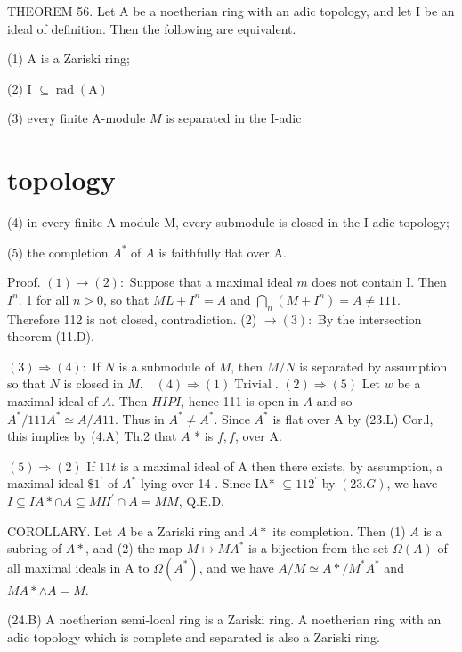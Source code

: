 THEOREM 56. Let A be a noetherian ring with an adic topology, and let I be an ideal of definition. Then the following are equivalent.

(1) A is a Zariski ring;

(2) I $\subseteq \operatorname{rad}(\mathrm{A})$

(3) every finite A-module $M$ is separated in the I-adic

\section{topology}
(4) in every finite A-module M, every submodule is closed in the I-adic topology;

(5) the completion $A^{*}$ of $A$ is faithfully flat over A.

Proof. $(1) \rightarrow(2):$ Suppose that a maximal ideal $m$ does not contain I. Then $I^{n}$. 1 for all $n>0$, so that $M L+I^{n}=A$ and $\bigcap_{n}\left(M+I^{n}\right)=A \neq 111$. Therefore 112 is not closed, contradiction. (2) $\rightarrow(3):$ By the intersection theorem (11.D).

$(3) \Rightarrow(4):$ If $N$ is a submodule of $M$, then $M / N$ is separated by assumption so that $N$ is closed in $M . \quad(4) \Rightarrow(1) \operatorname{Trivial}$. $(2) \Rightarrow(5)$ Let $w$ be a maximal ideal of $A .$ Then $H I P I$, hence 111 is open in $A$ and so $A^{*} / 111 A^{*} \simeq A / A 11$. Thus in $A^{*} \neq A^{*}$. Since $A^{*}$ is flat over A by (23.L) Cor.l, this implies by (4.A) Th.2 that $A$ * is $f, f$, over A.

$(5) \Rightarrow(2)$ If $11 t$ is a maximal ideal of A then there exists, by assumption, a maximal ideal $\$ 1^{\prime}$ of $A^{*}$ lying over 14 . Since IA* $\subseteq 112^{\prime}$ by $(23 . G)$, we have $I \subseteq I A * \cap A \subseteq M H^{\prime} \cap A=M M$, Q.E.D.

COROLLARY. Let $A$ be a Zariski ring and $A *$ its completion. Then (1) $A$ is a subring of $A *$, and (2) the map $M \mapsto M A^{*}$ is a bijection from the set $\Omega(A)$ of all maximal ideals in A to $\Omega\left(A^{*}\right)$, and we have $A / M \simeq A * / M^{*} A^{*}$ and $M A * \wedge A=M$.

(24.B) A noetherian semi-local ring is a Zariski ring. A noetherian ring with an adic topology which is complete and separated is also a Zariski ring.


